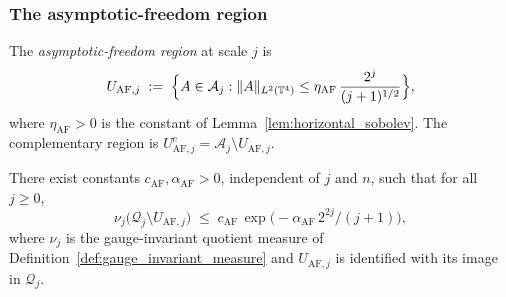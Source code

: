 \subsubsection{The asymptotic-freedom region}

\begin{definition}
\label{def:af_region}
The \emph{asymptotic-freedom region} at scale $j$ is
\begin{equation}
\label{eq:af_region}
  U_{\mathrm{AF},j}
  \;:=\;\Bigl\{A\in\mathcal{A}_{j}:
  \|A\|_{L^{2}(\mathbb{T}^{4})}\le
  \eta_{\mathrm{AF}}\,\frac{2^{j}}{(j+1)^{1/2}}\Bigr\},
\end{equation}
where $\eta_{\mathrm{AF}}>0$ is the constant of
Lemma~\ref{lem:horizontal_sobolev}. The complementary region
is $U_{\mathrm{AF},j}^{c}=\mathcal{A}_{j}\setminus
U_{\mathrm{AF},j}$.
\end{definition}

\begin{lemma}
\label{lem:af_concentration}
There exist constants $c_{\mathrm{AF}},\alpha_{\mathrm{AF}}>0$,
independent of $j$ and $n$, such that for all $j\ge 0$,
\begin{equation}
\label{eq:af_concentration}
  \nu_{j}\bigl(\mathcal{Q}_{j}\setminus U_{\mathrm{AF},j}\bigr)
  \;\le\;c_{\mathrm{AF}}\,\exp\!\bigl(-\alpha_{\mathrm{AF}}\,
  2^{2j}/(j+1)\bigr),
\end{equation}
where $\nu_{j}$ is the gauge-invariant quotient measure of
Definition~\ref{def:gauge_invariant_measure} and
$U_{\mathrm{AF},j}$ is identified with its image in
$\mathcal{Q}_{j}$.
\end{lemma}

